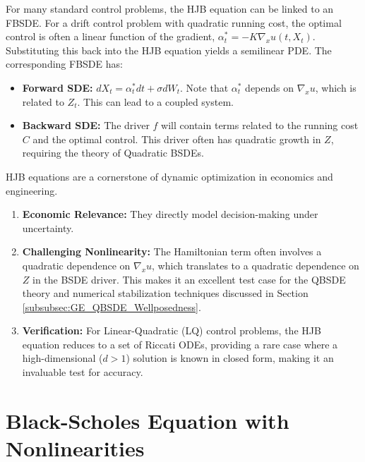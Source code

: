 \begin{proposition}
For many standard control problems, the HJB equation can be linked to an FBSDE. For a drift control problem with quadratic running cost, the optimal control is often a linear function of the gradient, \(\alpha_t^* = -K \nabla_x u(t,X_t)\). Substituting this back into the HJB equation yields a semilinear PDE. The corresponding FBSDE has:
\begin{itemize}
    \item \textbf{Forward SDE:} \(dX_t = \alpha_t^* dt + \sigma dW_t\). Note that \(\alpha_t^*\) depends on \(\nabla_x u\), which is related to \(Z_t\). This can lead to a coupled system.
    \item \textbf{Backward SDE:} The driver \(f\) will contain terms related to the running cost \(C\) and the optimal control. This driver often has quadratic growth in $Z$, requiring the theory of Quadratic BSDEs.
\end{itemize}
\end{proposition}

\begin{remark}
HJB equations are a cornerstone of dynamic optimization in economics and engineering.
\begin{enumerate}
    \item \textbf{Economic Relevance:} They directly model decision-making under uncertainty.
    \item \textbf{Challenging Nonlinearity:} The Hamiltonian term often involves a quadratic dependence on \(\nabla_x u\), which translates to a quadratic dependence on \(Z\) in the BSDE driver. This makes it an excellent test case for the QBSDE theory and numerical stabilization techniques discussed in Section \ref{subsubsec:GE_QBSDE_Wellposedness}.
    \item \textbf{Verification:} For Linear-Quadratic (LQ) control problems, the HJB equation reduces to a set of Riccati ODEs, providing a rare case where a high-dimensional (\(d>1\)) solution is known in closed form, making it an invaluable test for accuracy.
\end{enumerate}
\end{remark}

\section{Black-Scholes Equation with Nonlinearities}
\label{sec:nonlinear_bs}

